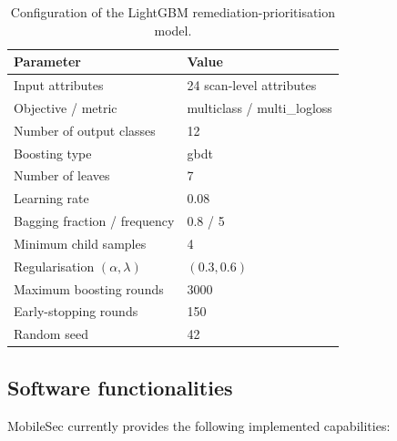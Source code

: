 \documentclass[preprint,12pt, a4paper]{elsarticle}
\begin{document}
{\color{blue}
\begin{table}[H]
\centering
\caption{Configuration of the LightGBM remediation-prioritisation model.}
\label{tab:lightgbm-configuration}
\begin{tabular}{ll}
\toprule
\textbf{Parameter} & \textbf{Value} \\
\midrule
Input attributes & 24 scan-level attributes \\
Objective / metric & multiclass / multi\_logloss \\
Number of output classes & 12 \\
Boosting type & gbdt \\
Number of leaves & 7 \\
Learning rate & 0.08 \\
Bagging fraction / frequency & 0.8 / 5 \\
Minimum child samples & 4 \\
Regularisation $(\alpha,\lambda)$ & $(0.3, 0.6)$ \\
Maximum boosting rounds & 3000 \\
Early-stopping rounds & 150 \\
Random seed & 42 \\
\bottomrule
\end{tabular}
\end{table}
}

\subsection{Software functionalities}

MobileSec currently provides the following implemented capabilities:
\end{document}
